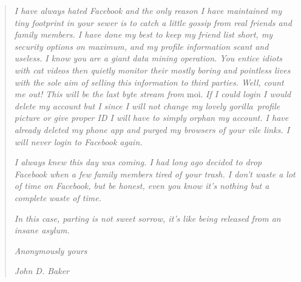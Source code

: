 \begin{quote}
\emph{I have always hated Facebook and the only reason I have maintained
my tiny footprint in your sewer is to catch a little gossip from real
friends and family members. I have done my best to keep my friend list
short, my security options on maximum, and my profile information scant
and useless. I know you are a giant data mining operation. You entice
idiots with cat videos then quietly monitor their mostly boring and
pointless lives with the sole aim of selling this information to third
parties. Well, count me out! This will be the last byte stream from}
moi. \emph{If I could login I would delete my account but I since I will
not change my lovely gorilla~profile picture or give proper ID I will
have to simply orphan my account. I have already deleted my phone app
and purged my browsers of your vile links. I will never login to
Facebook again.}

\emph{I always knew this day was coming. I had long ago decided to drop
Facebook when a few family members tired of your trash. I don't waste a
lot of time on Facebook, but be honest, even you know it's nothing but a
complete} \emph{waste of time.}

\emph{In this case, parting is not sweet sorrow, it's like being
released from an insane asylum.}

\emph{Anonymously yours}

\emph{John D. Baker}
\end{quote}



%